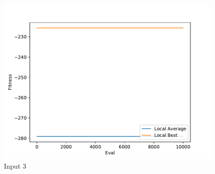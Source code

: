 \documentclass{standalone}
\begin{document}
\begin{figure}[!htb]
	\caption{Input 3}
	\label{fig:graph_3014}
	\includegraphics[width=\textwidth]{../graphs/graphs/3014.pdf}
\end{figure}
\end{document}
